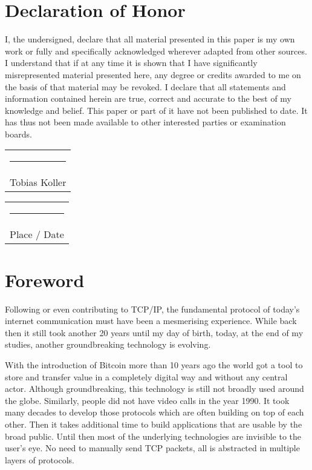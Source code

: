 \documentclass[final]{fhnwreport}       %
\begin{document}
\section*{Declaration of Honor}

I, the undersigned, declare that all material presented in this paper is my own work or fully and specifically acknowledged wherever adapted from other sources. I understand that if at any time it is shown that I have significantly misrepresented material presented here, any degree or credits awarded to me on the basis of that material may be revoked. I declare that all statements and information contained herein are true, correct and accurate to the best of my knowledge and belief. This  paper or part of it have not been published to date. It has thus not been made available to other interested parties or examination boards.  

\vspace*{4em}\noindent
\hfill%
\begin{tabular}[t]{c}
  \rule{10em}{0.4pt}\\Tobias Koller 
\end{tabular}%
\hfill%
\begin{tabular}[t]{c}
  \rule{10em}{0.4pt}\\ Place / Date
\end{tabular}%
\hfill\strut
\clearpage

\section*{Foreword}

Following or even contributing to TCP/IP, the fundamental protocol of today's internet communication must have been a mesmerising experience. While back then it still took another 20 years until my day of birth, today, at the end of my studies, another groundbreaking technology is evolving. 

With the introduction of Bitcoin more than 10 years ago the world got a tool to store and transfer value in a completely digital way and without any central actor. Although groundbreaking, this technology is still not broadly used around the globe. Similarly, people did not have video calls in the year 1990. It took many decades to develop those protocols which are often building on top of each other. Then it takes additional time to build applications that are usable by the broad public.  Until then most of the underlying technologies are invisible to the user's eye. No need to manually send TCP packets, all is abstracted in multiple layers of protocols.
\end{document}
